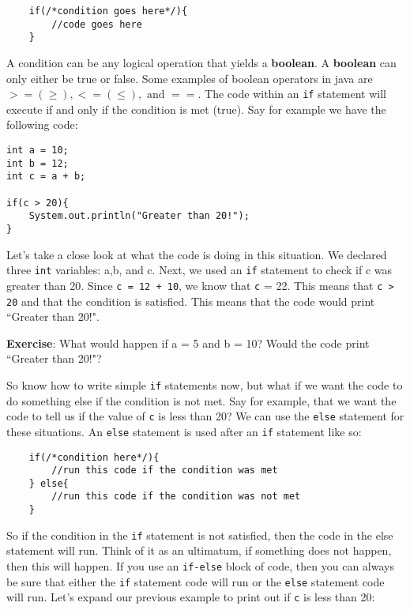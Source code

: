 \documentclass[11pt,fleqn]{article}
\begin{document}
\begin{verbatim}
    if(/*condition goes here*/){
        //code goes here
    }
\end{verbatim}

A condition can be any logical operation that yields a \textbf{boolean}. A
\textbf{boolean} can only either be true or false. Some examples of boolean
operators in java are $>= (\ge), <= (\le), \text{ and } ==$. The code within an
\texttt{if} statement will execute if and only if the condition is met (true).  
Say for example we have the following code:

\begin{verbatim}
int a = 10;
int b = 12;
int c = a + b;

if(c > 20){
    System.out.println("Greater than 20!");
}
\end{verbatim}

Let's take a close look at what the code is doing in this situation. We declared
three \texttt{int} variables: a,b, and c. Next, we used an \texttt{if} statement
to check if c was greater than 20. Since \texttt{c = 12 + 10}, we know that
\texttt{c} = 22. This means that \texttt{c > 20} and that the condition is
satisfied. This means that the code would print ``Greater than 20!". 

\textbf{Exercise}: What would happen if a = 5 and b = 10? Would the code print
``Greater than 20!"?

So know how to write simple \texttt{if} statements now, but what if we want the
code to do something else if the condition is not met. Say for example, that we
want the code to tell us if the value of \texttt{c} is less than 20? We can use
the \texttt{else} statement for these situations. An \texttt{else}
statement is used after an \texttt{if} statement like so:

\begin{verbatim}
    if(/*condition here*/){
        //run this code if the condition was met
    } else{
        //run this code if the condition was not met
    }
\end{verbatim}

So if the condition in the \texttt{if} statement is not satisfied, then the code
in the else statement will run. Think of it as an ultimatum, if something does
not happen, then this will happen. If you use an \texttt{if-else} block of code,
then you can always be sure that either the \texttt{if} statement code will run
or the \texttt{else} statement code will run. Let's expand our previous example
to print out if \texttt{c} is less than 20:
\end{document}
